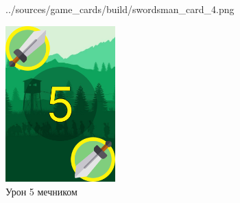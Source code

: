 \documentclass[12pt, a4paper, simple]{eskdtext}
\begin{document}
\begin{figure}[p!h]
\begin{minipage}{0.24\textwidth}
                {../sources/game_cards/build/swordsman_card_4.png}
            \caption{Урон 4 мечником}
            \label{fig:swordsman_card_4}
        \end{minipage}
        \begin{minipage}{0.24\textwidth}
            \centering
            \includegraphics[height=6cm]
                {../sources/game_cards/build/swordsman_card_5.png}
            \caption{Урон 5 мечником}
            \label{fig:swordsman_card_5}
        \end{minipage}
    \end{figure}
\end{document}
